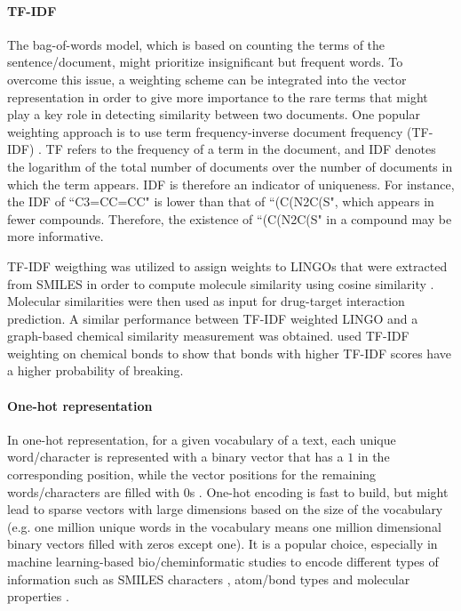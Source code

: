 \documentclass[review]{elsarticle}
\begin{document}
\paragraph{TF-IDF}
The bag-of-words model, which is based on counting the terms of the sentence/document, might prioritize insignificant but frequent words. To overcome this issue, a weighting scheme can be integrated into the vector representation in order to give more importance to the rare terms that might play a key role in detecting similarity between two documents. One popular weighting approach is to use term frequency-inverse document frequency (TF-IDF) \cite{jones2004statistical}. TF refers to the frequency of a term in the document, and IDF denotes the logarithm of the total number of documents over the number of documents in which the term appears.  IDF is therefore an indicator of uniqueness.  For instance, the IDF of ``C3=CC=CC" is lower than that of ``(C(N2C(S", which appears in fewer compounds. Therefore, the existence of ``(C(N2C(S" in a compound may be more informative.  

TF-IDF weigthing was utilized to assign weights to LINGOs that were extracted from SMILES in order to compute molecule similarity using cosine similarity \cite{ozturk2016comparative}. Molecular similarities were then used as input for drug-target interaction prediction. A similar performance between TF-IDF weighted LINGO and a graph-based chemical similarity measurement was obtained. \citet{cadeddu2014organic}  used TF-IDF weighting on chemical bonds to show that bonds with higher TF-IDF scores have a higher probability of breaking. 


\paragraph{One-hot representation} 
In one-hot representation, for a given vocabulary of a text, each unique word/character is represented with a binary vector that has a $1$ in the corresponding position, while the vector positions for the remaining words/characters are filled with $0$s \cite{bishop2006pattern}. One-hot encoding is fast to build, but might lead to sparse vectors with large dimensions based on the size of the vocabulary (e.g. one million unique words in the vocabulary means one million dimensional binary vectors filled with zeros except one). It is a popular choice, especially in  machine learning-based bio/cheminformatic studies to encode different types of information such as SMILES characters \cite{segler2017generating, kwon2017deepcci},  atom/bond types \cite{preuer2019interpretable, de2018molgan} and molecular properties \cite{mayr2016deeptox}. 
\end{document}

